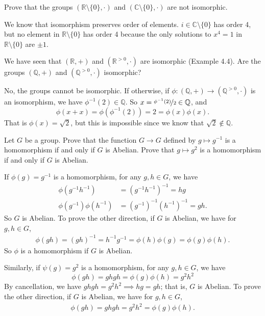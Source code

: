 \documentclass[parskip=full, draft]{scrartcl}
\begin{document}
\listoftodos
\begin{prob}{5}
    Prove that the groups \((\mathbb{R} \setminus \{0\}, \cdot)\) and \((\mathbb{C} \setminus \{0\}, \cdot)\) are not isomorphic.
\end{prob}
\begin{sol}
    We know that isomorphism preserves order of elements. \(i \in \mathbb{C} \setminus \{0\}\) has order 4, but no element in \(\mathbb{R} \setminus \{0\}\) has order 4 because the only solutions to \(x^4 = 1\) in \(\mathbb{R} \setminus \{0\}\) are \(\pm 1\).
\end{sol}
\begin{prob}{6}
    We have seen that \((\mathbb{R},+)\) and \((\mathbb{R}^{>0},\cdot)\) are isomorphic (Example 4.4). Are the groups \((\mathbb{Q}, +)\) and \((\mathbb{Q}^{>0} , \cdot)\) isomorphic?
\end{prob}
\begin{sol}
    No, the groups cannot be isomorphic. If otherwise, if \(\phi: (\mathbb{Q}, +) \to (\mathbb{Q}^{>0}, \cdot)\) is an isomorphism, we have \(\phi^{-1}(2) \in \mathbb{Q}\). So \(x = \nicefrac{\phi^{-1}(2)}{2} \in \mathbb{Q}\), and
    \[
        \phi(x + x) = \phi(\phi^{-1}(2)) = 2 = \phi(x)\phi(x).
    \]
    That is \(\phi(x) = \sqrt{2}\), but this is impossible since we know that \(\sqrt{2} \notin \mathbb{Q}\).
\end{sol}
\begin{prob}{7}
    Let \(G\) be a group. Prove that the function \(G\to G\) defined by \(g\mapsto g^{-1}\) is a homomorphism if and only if \(G\) is Abelian. Prove that \(g \mapsto g^2\) is a homomorphism if and only if \(G\) is Abelian.
\end{prob}
\begin{sol}
    If \(\phi(g) = g^{-1}\) is a homomorphism, for any \(g, h \in G\), we have
    \begin{align*}
        \phi(g^{-1}h^{-1}) &= (g^{-1}h^{-1})^{-1} = hg\\
        \phi(g^{-1})\phi(h^{-1}) &= (g^{-1})^{-1}(h^{-1})^{-1} = gh.
    \end{align*}
    So \(G\) is Abelian. To prove the other direction, if \(G\) is Abelian, we have for \(g, h \in G\),
    \begin{align*}
        \phi(gh) = (gh)^{-1} = h^{-1} g^{-1} = \phi(h)\phi(g) = \phi(g)\phi(h).
    \end{align*}
    So \(\phi\) is a homomorphism if \(G\) is Abelian.
    
    Similarly, if \(\psi(g) = g^2\) is a homomorphism, for any \(g, h \in G\), we have
    \[
        \phi(gh) = ghgh = \phi(g)\phi(h) = g^2 h^2
    \]
    By cancellation, we have \(ghgh = g^2 h^2 \implies hg = gh\); that is, \(G\) is Abelian. To prove the other direction, if \(G\) is Abelian, we have for \(g, h \in G\),
    \begin{align*}
        \phi(gh) = ghgh = g^2 h^2 = \phi(g)\phi(h).
    \end{align*}
\end{sol}
\end{document}
